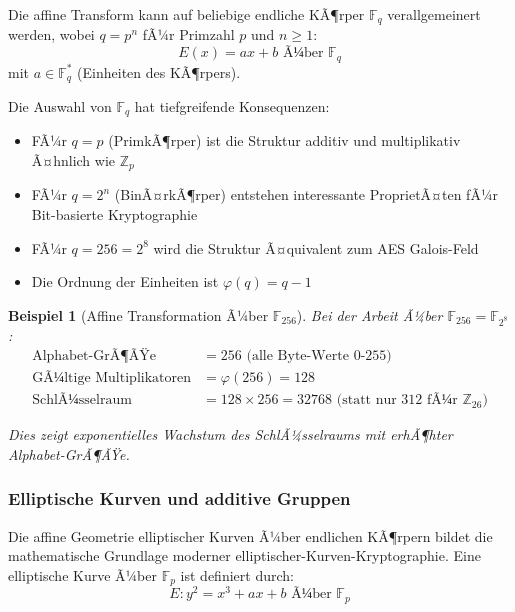 ﻿\documentclass[12pt,a4paper]{article}
\newtheorem{example}{Beispiel}
\begin{document}
	Die affine Transform kann auf beliebige endliche KÃ¶rper $\mathbb{F}_q$ verallgemeinert werden, wobei $q = p^n$ fÃ¼r Primzahl $p$ und $n \geq 1$:
	\begin{equation}
		E(x) = ax + b \text{ Ã¼ber } \mathbb{F}_q
	\end{equation}
	mit $a \in \mathbb{F}_q^*$ (Einheiten des KÃ¶rpers).
	
	Die Auswahl von $\mathbb{F}_q$ hat tiefgreifende Konsequenzen:
	\begin{itemize}
		\item FÃ¼r $q = p$ (PrimkÃ¶rper) ist die Struktur additiv und multiplikativ Ã¤hnlich wie $\mathbb{Z}_p$
		\item FÃ¼r $q = 2^n$ (BinÃ¤rkÃ¶rper) entstehen interessante ProprietÃ¤ten fÃ¼r Bit-basierte Kryptographie
		\item FÃ¼r $q = 256 = 2^8$ wird die Struktur Ã¤quivalent zum AES Galois-Feld
		\item Die Ordnung der Einheiten ist $\varphi(q) = q - 1$
	\end{itemize}
	
	\begin{example}[Affine Transformation Ã¼ber $\mathbb{F}_{256}$]
		Bei der Arbeit Ã¼ber $\mathbb{F}_{256} = \mathbb{F}_{2^8}$:
		\begin{align}
			\text{Alphabet-GrÃ¶ÃŸe} &= 256 \text{ (alle Byte-Werte 0-255)} \\
			\text{GÃ¼ltige Multiplikatoren} &= \varphi(256) = 128 \\
			\text{SchlÃ¼sselraum} &= 128 \times 256 = 32768 \text{ (statt nur 312 fÃ¼r } \mathbb{Z}_{26})
		\end{align}
		
		Dies zeigt exponentielles Wachstum des SchlÃ¼sselraums mit erhÃ¶hter Alphabet-GrÃ¶ÃŸe.
	\end{example}
	
	\subsubsection{Elliptische Kurven und additive Gruppen}
	
	Die affine Geometrie elliptischer Kurven Ã¼ber endlichen KÃ¶rpern bildet die mathematische Grundlage moderner elliptischer-Kurven-Kryptographie. Eine elliptische Kurve Ã¼ber $\mathbb{F}_p$ ist definiert durch:
	\begin{equation}
		E: y^2 = x^3 + ax + b \text{ Ã¼ber } \mathbb{F}_p
	\end{equation}
	
\end{document}
